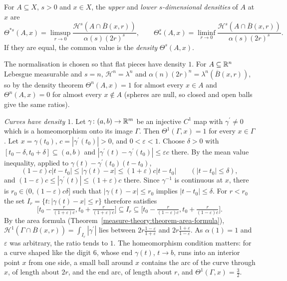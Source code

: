 \begin{definition}\label{measure-theory:definition-density}
For $A \subseteq X$, $s > 0$ and $x \in X$, the \emph{upper} and \emph{lower $s$-dimensional densities} of $A$ at $x$ are
\[
\Theta^{*s}(A, x) = \limsup_{r \to 0}\frac{\mathcal{H}^s(A \cap \overline{B}(x, r))}{\alpha(s)(2r)^s}, \qquad \Theta^s_*(A, x) = \liminf_{r \to 0}\frac{\mathcal{H}^s(A \cap \overline{B}(x, r))}{\alpha(s)(2r)^s}.
\]
If they are equal, the common value is the \emph{density} $\Theta^s(A, x)$.
\end{definition}

The normalisation is chosen so that flat pieces have density $1$. For $A \subseteq \mathbb{R}^n$ Lebesgue measurable and $s = n$, $\mathcal{H}^n = \lambda^n$ and $\alpha(n)(2r)^n = \lambda^n(\overline{B}(x, r))$,
so by the density theorem $\Theta^n(A, x) = 1$ for almost every $x \in A$ and $\Theta^n(A, x) = 0$ for almost every $x \notin A$ (spheres are null, so closed and open balls give the same ratios).

\begin{example}\label{measure-theory:example-density-curve}
\emph{Curves have density $1$.} Let $\gamma \colon (a, b) \to \mathbb{R}^m$ be an injective $C^1$ map with $\gamma^{\prime} \neq 0$ which is a homeomorphism onto its image $\Gamma$. Then
$\Theta^1(\Gamma, x) = 1$ for every $x \in \Gamma$. Let $x = \gamma(t_0)$, $c = |\gamma^{\prime}(t_0)| > 0$, and $0 < \varepsilon < 1$. Choose $\delta > 0$ with $[t_0 - \delta, t_0 + \delta] \subseteq (a, b)$
and $|\gamma^{\prime}(t) - \gamma^{\prime}(t_0)| \leq \varepsilon c$ there. By the mean value inequality, applied to $\gamma(t) - \gamma^{\prime}(t_0)(t - t_0)$,
\[
(1 - \varepsilon)c|t - t_0| \leq |\gamma(t) - x| \leq (1 + \varepsilon)c|t - t_0| \qquad (|t - t_0| \leq \delta),
\]
and $(1 - \varepsilon)c \leq |\gamma^{\prime}(t)| \leq (1 + \varepsilon)c$ there. Since $\gamma^{-1}$ is continuous at $x$, there is $r_0 \in (0, (1 - \varepsilon)c\delta]$ such that
$|\gamma(t) - x| \leq r_0$ implies $|t - t_0| \leq \delta$. For $r < r_0$ the set $I_r = \{t : |\gamma(t) - x| \leq r\}$ therefore satisfies
\[
\bigl[t_0 - \tfrac{r}{(1 + \varepsilon)c}, t_0 + \tfrac{r}{(1 + \varepsilon)c}\bigr] \subseteq I_r \subseteq \bigl[t_0 - \tfrac{r}{(1 - \varepsilon)c}, t_0 + \tfrac{r}{(1 - \varepsilon)c}\bigr].
\]
By the area formula (Theorem~\ref{measure-theory:theorem-area-formula}), $\mathcal{H}^1(\Gamma \cap \overline{B}(x, r)) = \int_{I_r}|\gamma^{\prime}|$ lies between $2r\frac{1 - \varepsilon}{1 + \varepsilon}$ and
$2r\frac{1 + \varepsilon}{1 - \varepsilon}$. As $\alpha(1) = 1$ and $\varepsilon$ was arbitrary, the ratio tends to $1$. The homeomorphism condition matters: for a curve shaped like the digit $6$, whose end
$\gamma(t)$, $t \to b$, runs into an interior point $x$ from one side, a small ball around $x$ contains the arc of the curve through $x$, of length about $2r$, and the end arc, of length about $r$, and $\Theta^1(\Gamma, x) = \frac32$.
\end{example}

